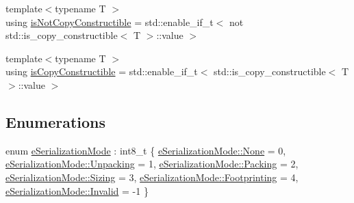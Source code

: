 \begin{DoxyCompactItemize}
\item 
{\footnotesize template$<$typename T $>$ }\\using \hyperlink{namespacecheckpoint_a141a100f9dcca06fb0b6dbf44a5d6756}{is\+Not\+Copy\+Constructible} = std\+::enable\+\_\+if\+\_\+t$<$ not std\+::is\+\_\+copy\+\_\+constructible$<$ T $>$\+::value $>$
\item 
{\footnotesize template$<$typename T $>$ }\\using \hyperlink{namespacecheckpoint_a60a9850fa59d4b236b2f888baf135a95}{is\+Copy\+Constructible} = std\+::enable\+\_\+if\+\_\+t$<$ std\+::is\+\_\+copy\+\_\+constructible$<$ T $>$\+::value $>$
\end{DoxyCompactItemize}
\subsection*{Enumerations}
\begin{DoxyCompactItemize}
\item 
enum \hyperlink{namespacecheckpoint_ae2509499ccd8b1dc48fb535bf8aa3059}{e\+Serialization\+Mode} \+: int8\+\_\+t \{ \newline
\hyperlink{namespacecheckpoint_ae2509499ccd8b1dc48fb535bf8aa3059a6adf97f83acf6453d4a6a4b1070f3754}{e\+Serialization\+Mode\+::\+None} = 0, 
\hyperlink{namespacecheckpoint_ae2509499ccd8b1dc48fb535bf8aa3059a9b87ab5a4e2e99d758991f06cad9c3bf}{e\+Serialization\+Mode\+::\+Unpacking} = 1, 
\hyperlink{namespacecheckpoint_ae2509499ccd8b1dc48fb535bf8aa3059ac46192253e8458f209a350a132cfc876}{e\+Serialization\+Mode\+::\+Packing} = 2, 
\hyperlink{namespacecheckpoint_ae2509499ccd8b1dc48fb535bf8aa3059a92672a7a2b909945fbfa9f44f057c7a1}{e\+Serialization\+Mode\+::\+Sizing} = 3, 
\newline
\hyperlink{namespacecheckpoint_ae2509499ccd8b1dc48fb535bf8aa3059afa42c5852085bf97b53b351ba4fcc474}{e\+Serialization\+Mode\+::\+Footprinting} = 4, 
\hyperlink{namespacecheckpoint_ae2509499ccd8b1dc48fb535bf8aa3059a4bbb8f967da6d1a610596d7257179c2b}{e\+Serialization\+Mode\+::\+Invalid} = -\/1
 \}
\end{DoxyCompactItemize}
